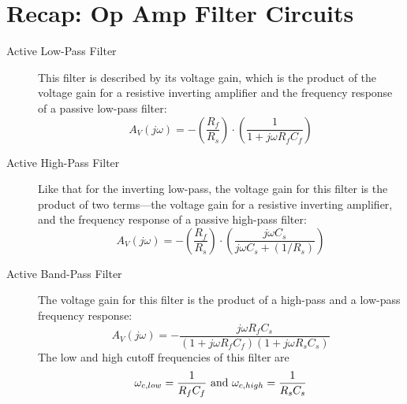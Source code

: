 \section{Recap: Op Amp Filter Circuits}
\begin{description}
\item[Active Low-Pass Filter] This filter is described by its voltage gain, which is the product of the voltage gain for a resistive inverting amplifier and the frequency response of a passive low-pass filter:
$$
A_V(j\omega) = -\left(\frac{R_f}{R_s}\right)\cdot\left(\frac{1}{1+j\omega R_fC_f}\right)
$$
\item[Active High-Pass Filter] Like that for the inverting low-pass, the voltage gain for this filter is the product of two terms---the voltage gain for a resistive inverting amplifier, and the frequency response of a passive high-pass filter:
$$
A_V(j\omega) = -\left(\frac{R_f}{R_s}\right)\cdot\left(\frac{j\omega C_s}{j\omega C_s+(1/R_s)}\right)
$$

\item[Active Band-Pass Filter] The voltage gain for this filter is the product of a high-pass and a low-pass frequency response:
$$
A_V(j\omega) = -\frac{j\omega R_fC_s}{(1+ j\omega R_fC_f)(1 + j\omega R_sC_s)}
$$
The low and high cutoff frequencies of this filter are
$$
\omega_{c,low} = \frac{1}{R_fC_f}\textnormal{             and             } \omega_{c,high} = \frac{1}{R_sC_s}
$$
\end{description}